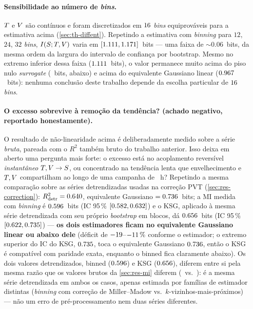 \paragraph{Sensibilidade ao número de \emph{bins}.} $T$ e $V$ são
contínuos e foram discretizados em $16$ \emph{bins} equiprováveis
para a estimativa acima (\cref{sec:th-diffent}). Repetindo a estimativa com
\emph{binning} para $12$, $24$, $32$ \emph{bins}, $I\!\left(S ; T,V\right)$ varia
em $[1.111,1.171]$~bits --- uma faixa de
$\sim$0.06~bits, da mesma ordem da largura do intervalo de confiança por
bootstrap. Mesmo no extremo inferior dessa faixa ($1.111$~bits), o
valor permanece muito acima do piso nulo \emph{surrogate}
(\valMInullFloor~bits, abaixo) e acima do equivalente Gaussiano linear
($0.967$~bits): nenhuma conclusão deste trabalho depende da escolha
particular de $16$ \emph{bins}.

\paragraph{O excesso sobrevive à remoção da tendência? (achado negativo,
reportado honestamente).} O resultado de não-linearidade acima é
deliberadamente medido sobre a série \emph{bruta}, pareada com o $R^2$
também bruto do trabalho anterior. Isso deixa em aberto uma pergunta mais
forte: o excesso está no acoplamento reversível \emph{instantâneo}
$T,V\to S$, ou concentrado na tendência lenta que envelhecimento
e $T,V$ compartilham ao longo de uma campanha de
\valDurationHours~h? Repetindo a mesma comparação sobre as séries
detrendizadas usadas na correção PVT (\cref{sec:res-correction}):
$R^2_{\text{detr}}=0.640$, equivalente Gaussiano
$=0.736$~bits; a MI medida com \emph{binning} é
$0.596$~bits (IC 95\,\% $[0.582,0.632]$) e o KSG,
aplicado à mesma série detrendizada com seu próprio \emph{bootstrap} em
blocos, dá $0.656$~bits (IC 95\,\% $[0.622,0.735]$)
--- \textbf{os dois estimadores ficam no equivalente Gaussiano linear ou
abaixo dele} (déficit de $-19$--$-11\,\%$
conforme o estimador; o extremo superior do IC do KSG, $0.735$,
toca o equivalente Gaussiano $0.736$, então o KSG é
compatível com paridade exata, enquanto o binned fica claramente abaixo).
Os dois valores detrendizados, binned ($0.596$) e KSG
($0.656$), diferem entre si pela mesma razão que os valores brutos da
\cref{sec:res-mi} diferem (\valMIstv\ vs.\ \valKSGstv): é a mesma série
detrendizada em ambos os casos, apenas estimada por famílias de estimador
distintas (\emph{binning} com correção de Miller--Madow vs.\
$k$-vizinhos-mais-próximos) --- não um erro de pré-processamento nem duas
séries diferentes.

